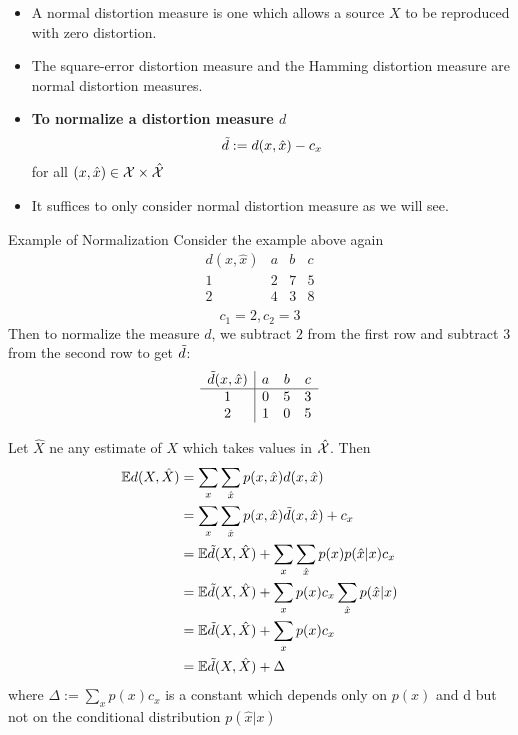 \documentclass[../main.tex]{subfiles}
\begin{document}
\begin{itemize}
    \item A normal distortion measure is one which allows a source $X$ to be reproduced with zero distortion.
    \item The square-error distortion measure and the Hamming distortion measure are normal distortion measures.
    \item \textbf{To normalize a distortion measure $d$} \[
    \Tilde{d} := d(x,\hat x)-c_x
    \] for all $(x,\hat x) \in \mathcal{X}\times \hat {\mathcal{X}}$
    \item It suffices to only consider normal distortion measure as we will see.
\end{itemize}
\begin{pbox}{Example of Normalization}
Consider the example above again \[
\begin{array}{c|ccc}
d(x, \hat{x}) & a & b & c \\
\hline
1 & 2 & 7 & 5 \\
2 & 4 & 3 & 8 \\
\end{array}
\]
\[
c_1 = 2, c_2 =3
\]
Then to normalize the measure $d$, we subtract $2$ from the first row and subtract $3$ from the second row to get $\Tilde{d}$:
\[
\begin{array}{c|ccc}
\Tilde{d}(x, \hat{x}) & a & b & c \\
\hline
1 & 0 & 5 & 3 \\
2 & 1 & 0 & 5 \\
\end{array}
\]
\end{pbox}
Let $\hat X$ ne any estimate of $X$ which takes values in $\hat {\mathcal{X}}$. Then \begin{align*}
    \mathbb{E} d(X,\hat X)&=\sum_x\sum_{\hat x} p(x,\hat x)d(x,\hat x)\\
    &= \sum_x\sum_{\hat x} p(x,\hat x)\Tilde{d}(x,\hat x) + c_x\\
    &= \mathbb{E} \Tilde{d}(X,\hat X) + \sum_x\sum_{\hat x} p(x)p(\hat x|x) c_x\\
    &= \mathbb{E} \Tilde{d}(X,\hat X) + \sum_x p(x)c_x\sum_{\hat x} p(\hat x| x) \\
    &= \mathbb{E} \Tilde{d}(X,\hat X) + \sum_x p(x)c_x\\
    &= \mathbb{E} \Tilde{d}(X,\hat X) + \Delta
\end{align*} where $\Delta := \sum_x p(x)c_x$ is a constant which depends only on $p(x)$ and d but not on the conditional distribution $p(\hat x|x)$
\end{document}
